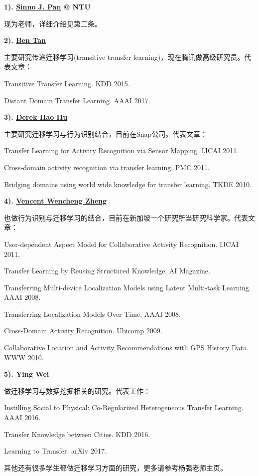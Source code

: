 \textbf{1). \href{http://www.cs.ust.hk/~qyang/}{Sinno J. Pan} @ NTU}

现为老师，详细介绍见第二条。

\textbf{2). \href{https://sites.google.com/view/btan/home}{Ben Tan}}

主要研究传递迁移学习(transitive transfer learning)，现在腾讯做高级研究员。代表文章：

Transitive Transfer Learning. KDD 2015.

Distant Domain Transfer Learning. AAAI 2017.

\textbf{3).  \href{https://scholar.google.com/citations?user=Ks81aO0AAAAJ&hl=zh-CN&oi=ao}{Derek Hao Hu}}

主要研究迁移学习与行为识别结合，目前在Snap公司。代表文章：

Transfer Learning for Activity Recognition via Sensor Mapping. IJCAI 2011.

Cross-domain activity recognition via transfer learning. PMC 2011.

Bridging domains using world wide knowledge for transfer learning. TKDE 2010.

\textbf{4). \href{https://sites.google.com/site/vincentwzheng/}{Vencent Wencheng Zheng}}

也做行为识别与迁移学习的结合，目前在新加坡一个研究所当研究科学家。代表文章：

User-dependent Aspect Model for Collaborative Activity Recognition. IJCAI 2011.

Transfer Learning by Reusing Structured Knowledge. AI Magazine.

Transferring Multi-device Localization Models using Latent Multi-task Learning. AAAI 2008.

Transferring Localization Models Over Time. AAAI 2008.

Cross-Domain Activity Recognition. Ubicomp 2009.

Collaborative Location and Activity Recommendations with GPS History Data. WWW 2010.

\textbf{5). Ying Wei}

做迁移学习与数据挖掘相关的研究。代表工作：

Instilling Social to Physical: Co-Regularized Heterogeneous Transfer Learning. AAAI 2016.

Transfer Knowledge between Cities. KDD 2016.

Learning to Transfer. arXiv 2017.

其他还有很多学生都做迁移学习方面的研究，更多请参考杨强老师主页。

